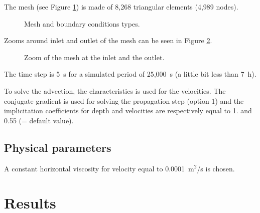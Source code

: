 The mesh (see Figure \ref{t2d:riogrande:meshbnd}) is made of 8,268
triangular elements (4,989 nodes).

\begin{figure}[!htbp]
\begin{minipage}[t]{0.5\textwidth}
 \centering
\end{minipage}
\begin{minipage}[t]{0.5\textwidth}
 \centering
\end{minipage}
\caption{Mesh and boundary conditions types.}
\label{t2d:riogrande:meshbnd}
\end{figure}

Zooms around inlet and outlet of the mesh can be seen in Figure
\ref{t2d:riogrande:meshinout}.

\begin{figure}[!htbp]
\begin{minipage}[t]{0.5\textwidth}
 \centering
\end{minipage}
\begin{minipage}[t]{0.5\textwidth}
 \centering
\end{minipage}
\caption{Zoom of the mesh at the inlet and the outlet.}
\label{t2d:riogrande:meshinout}
\end{figure}

The time step is 5~s for a simulated period of 25,000~s
(a little bit less than 7~h).

To solve the advection, the characteristics is used for the velocities.
The conjugate gradient
is used for solving the propagation step (option 1) and
the implicitation coefficients
for depth and velocities are respectively equal to 1. and 0.55 (= default value).

\subsection{Physical parameters}

A constant horizontal viscosity for velocity equal to 0.0001~m$^2$/s is chosen.

\section{Results}

